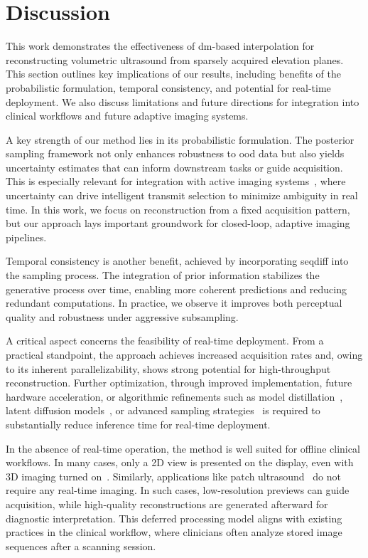 \documentclass[journal,twoside,web,dvipsnames]{ieeecolor}          %
\begin{document}
\section{Discussion}
This work demonstrates the effectiveness of \acrshort{dm}-based interpolation for reconstructing volumetric ultrasound from sparsely acquired elevation planes. This section outlines key implications of our results, including benefits of the probabilistic formulation, temporal consistency, and potential for real-time deployment. We also discuss limitations and future directions for integration into clinical workflows and future adaptive imaging systems.

A key strength of our method lies in its probabilistic formulation. The posterior sampling framework not only enhances robustness to \acrshort{ood} data but also yields uncertainty estimates that can inform downstream tasks or guide acquisition. This is especially relevant for integration with active imaging systems~\cite{federici2024active, van2024active, nolan2024active}, where uncertainty can drive intelligent transmit selection to minimize ambiguity in real time. In this work, we focus on reconstruction from a fixed acquisition pattern, but our approach lays important groundwork for closed-loop, adaptive imaging pipelines.

Temporal consistency is another benefit, achieved by incorporating \acrshort{seqdiff} into the sampling process. The integration of prior information stabilizes the generative process over time, enabling more coherent predictions and reducing redundant computations. In practice, we observe it improves both perceptual quality and robustness under aggressive subsampling.

A critical aspect concerns the feasibility of real-time deployment. From a practical standpoint, the approach achieves increased acquisition rates and, owing to its inherent parallelizability, shows strong potential for high-throughput reconstruction. Further optimization, through improved implementation, future hardware acceleration, or algorithmic refinements such as model distillation~\cite{meng2023distillation}, latent diffusion models~\cite{rombach2022high}, or advanced sampling strategies~\cite{ma2024deepcache} is required to substantially reduce inference time for real-time deployment.

In the absence of real-time operation, the method is well suited for offline clinical workflows. In many cases, only a 2D view is presented on the display, even with 3D imaging turned on~\cite{huang2017review}. Similarly, applications like patch ultrasound~\cite{hu2023wearable} do not require any real-time imaging. In such cases, low-resolution previews can guide acquisition, while high-quality reconstructions are generated afterward for diagnostic interpretation. This deferred processing model aligns with existing practices in the clinical workflow, where clinicians often analyze stored image sequences after a scanning session.
\end{document}
